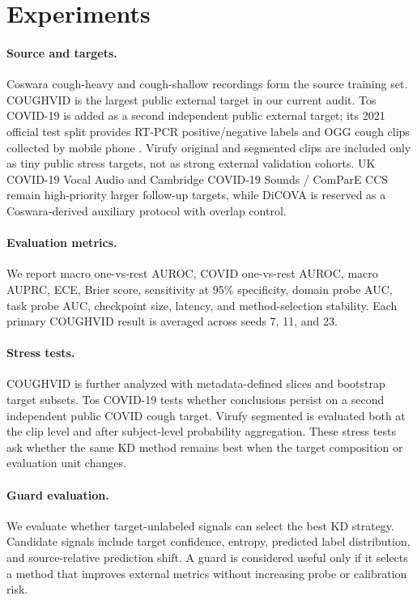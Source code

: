 \section{Experiments}
\label{sec:experiments}

\paragraph{Source and targets.}
Coswara cough-heavy and cough-shallow recordings form the source training set. COUGHVID is the largest public external target in our current audit. Tos COVID-19 is added as a second independent public external target; its 2021 official test split provides RT-PCR positive/negative labels and OGG cough clips collected by mobile phone \cite{buenosaires2021toscovid}. Virufy original and segmented clips are included only as tiny public stress targets, not as strong external validation cohorts. UK COVID-19 Vocal Audio and Cambridge COVID-19 Sounds / ComParE CCS remain high-priority larger follow-up targets, while DiCOVA is reserved as a Coswara-derived auxiliary protocol with overlap control.

\paragraph{Evaluation metrics.}
We report macro one-vs-rest AUROC, COVID one-vs-rest AUROC, macro AUPRC, ECE, Brier score, sensitivity at 95\% specificity, domain probe AUC, task probe AUC, checkpoint size, latency, and method-selection stability. Each primary COUGHVID result is averaged across seeds 7, 11, and 23.

\paragraph{Stress tests.}
COUGHVID is further analyzed with metadata-defined slices and bootstrap target subsets. Tos COVID-19 tests whether conclusions persist on a second independent public COVID cough target. Virufy segmented is evaluated both at the clip level and after subject-level probability aggregation. These stress tests ask whether the same KD method remains best when the target composition or evaluation unit changes.

\paragraph{Guard evaluation.}
We evaluate whether target-unlabeled signals can select the best KD strategy. Candidate signals include target confidence, entropy, predicted label distribution, and source-relative prediction shift. A guard is considered useful only if it selects a method that improves external metrics without increasing probe or calibration risk.
